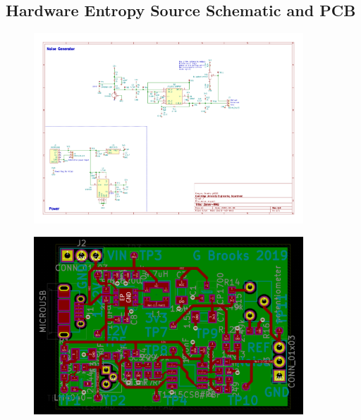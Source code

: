 \documentclass[12pt]{article}
\begin{document}
\begin{appendix}
  \section{Hardware Entropy Source Schematic and PCB} \label{appendix:schematic}
  \vspace{-1cm}
    \begin{figure}[H]
      \centering
      \includegraphics[angle=90,width=0.9\textwidth]{fig/schematic.pdf}
      \label{fig:schematic}
    \end{figure}

    \newpage

    \vspace{-1.5cm}
    \begin{figure}[H]
      \centering
      \includegraphics[angle=90, width=0.9\textwidth]{fig/pcb.PNG}
      \label{fig:pcb}
    \end{figure}

    \newpage



\end{appendix}
\end{document}

